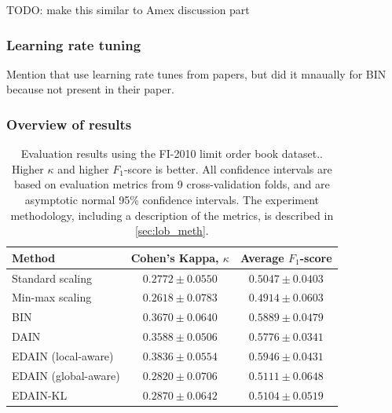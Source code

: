 \documentclass{statsmsc}
\begin{document}
{TODO: make this similar to Amex discussion part

\subsubsection{Learning rate tuning}%
\label{ssub:Learning rate tuning}

Mention that use learning rate tunes from papers, but did it mnaually for BIN because not
present in their paper.

\subsubsection{Overview of results}%
\label{ssub:Overview of results}

\begin{table}[htp]
    \centering
    \begin{tabular}{lcc}
        \toprule
        Method & Cohen's Kappa, $\kappa$ & Average $F_1$-score \\
        \midrule
        Standard scaling & $0.2772 \pm 0.0550$ & $0.5047 \pm 0.0403$ \\
        Min-max scaling & $0.2618 \pm 0.0783$ & $0.4914 \pm 0.0603$ \\
        BIN & $0.3670 \pm 0.0640$ & $0.5889 \pm 0.0479$ \\
        DAIN & $0.3588 \pm 0.0506$ & $0.5776 \pm 0.0341$ \\
        EDAIN (local-aware) & $\bm{0.3836 \pm 0.0554}$ & $\bm{0.5946 \pm 0.0431}$ \\
        EDAIN (global-aware) & $0.2820 \pm 0.0706$ & $0.5111 \pm 0.0648$ \\
        EDAIN-KL & $0.2870 \pm 0.0642$ & $0.5104 \pm 0.0519$ \\
        \bottomrule
    \end{tabular}%
    \caption{
        Evaluation results using the FI-2010 limit order book dataset..
        Higher $\kappa$ and higher $F_1$-score is better.
        All confidence intervals are based on evaluation metrics from 9 cross-validation folds,
        and are asymptotic normal 95\% confidence intervals.
        The experiment methodology, including a description of the metrics,
        is described in  \cref{sec:lob_meth}.
    }%
    \label{tab:lob_performance}%
\end{table}

}
\end{document}
